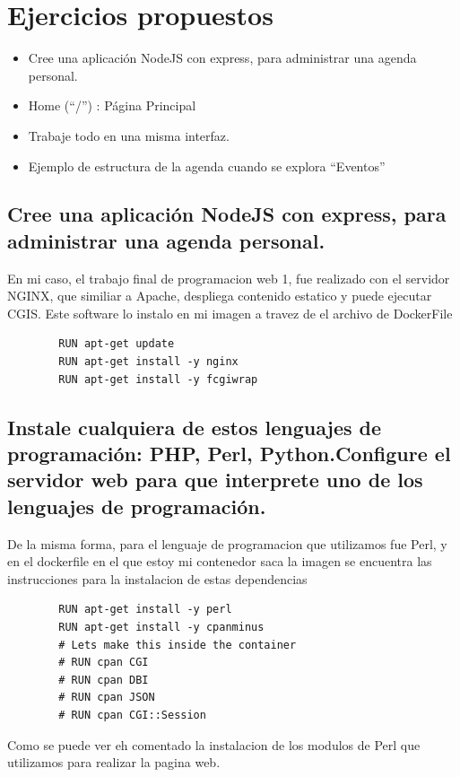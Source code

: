\section{Ejercicios propuestos}

\begin{itemize}
    \item Cree una aplicación NodeJS con express, para administrar una agenda personal.
    \item Home (“/”) : Página Principal
    \item Trabaje todo en una misma interfaz.
    \item Ejemplo de estructura de la agenda cuando se explora “Eventos”
\end{itemize}

	
	\subsection*{Cree una aplicación NodeJS con express, para administrar una agenda personal.}
	En mi caso, el trabajo final de programacion web 1, fue realizado con el servidor NGINX, que similiar a Apache, despliega contenido estatico y puede ejecutar
	CGIS. Este software lo instalo en mi imagen a travez de el archivo de DockerFile

	\begin{lstlisting}
		RUN apt-get update
		RUN apt-get install -y nginx
		RUN apt-get install -y fcgiwrap
	\end{lstlisting}
	
	\subsection{Instale cualquiera de estos lenguajes de programación: PHP, Perl, Python.\newline Configure el servidor web para que interprete uno de los lenguajes de programación.}
	De la misma forma, para el lenguaje de programacion que utilizamos fue Perl, y en el dockerfile en el que estoy mi contenedor saca la imagen se encuentra las instrucciones para la 
	instalacion de estas dependencias
	
	\begin{lstlisting}
		RUN apt-get install -y perl
		RUN apt-get install -y cpanminus
		# Lets make this inside the container
		# RUN cpan CGI
		# RUN cpan DBI
		# RUN cpan JSON
		# RUN cpan CGI::Session
	\end{lstlisting}

	Como se puede ver eh comentado la instalacion de los modulos de Perl que utilizamos para realizar la pagina web.

